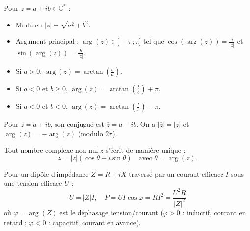 \documentclass[11pt]{article}
\begin{document}
\begin{propriete}
Pour $z = a + ib \in \mathbb{C}^*$ :
\begin{itemize}
    \item Module : $|z| = \sqrt{a^2 + b^2}$.
    \item Argument principal : $\arg(z) \in ]-\pi; \pi]$ tel que $\cos(\arg(z)) = \frac{a}{|z|}$ et $\sin(\arg(z)) = \frac{b}{|z|}$.
    \item Si $a > 0$, $\arg(z) = \arctan\left(\frac{b}{a}\right)$.
    \item Si $a < 0$ et $b \ge 0$, $\arg(z) = \arctan\left(\frac{b}{a}\right) + \pi$.
    \item Si $a < 0$ et $b < 0$, $\arg(z) = \arctan\left(\frac{b}{a}\right) - \pi$.
\end{itemize}
\end{propriete}

\begin{propriete}
Pour $z = a + ib$, son conjugué est $\overline{z} = a - ib$.
On a $|\overline{z}| = |z|$ et $\arg(\overline{z}) = -\arg(z)$ (modulo $2\pi$).
\end{propriete}

\begin{propriete}
Tout nombre complexe non nul $z$ s'écrit de manière unique :
\[ z = |z|(\cos\theta + i\sin\theta) \quad \text{avec } \theta = \arg(z). \]
\end{propriete}

\begin{propriete}
Pour un dipôle d'impédance $Z = R + iX$ traversé par un courant efficace $I$ sous une tension efficace $U$ :
\[ U = |Z| I, \quad P = U I \cos\varphi = R I^2 = \frac{U^2 R}{|Z|^2} \]
où $\varphi = \arg(Z)$ est le déphasage tension/courant ($\varphi > 0$ : inductif, courant en retard ; $\varphi < 0$ : capacitif, courant en avance).
\end{propriete}
\end{document}
